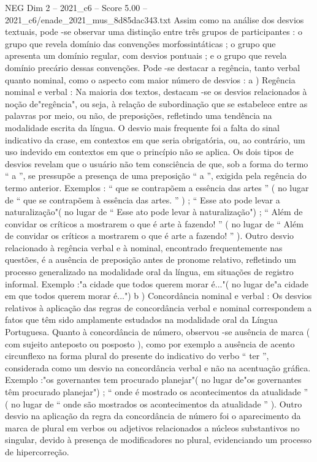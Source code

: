 \begin{textsample}{NEG Dim 2 – 2021\_c6 – Score 5.00 – 2021\_c6/enade\_2021\_mus\_8d85dac343.txt}
Assim como na análise dos desvios textuais, pode -se observar uma distinção entre três grupos de participantes : o grupo que revela domínio das convenções morfossintáticas ; o grupo que apresenta um domínio regular, com desvios pontuais ; e o grupo que revela domínio precário dessas convenções.
Pode -se destacar a regência, tanto verbal quanto nominal, como o aspecto com maior número de desvios : a ) Regência nominal e verbal : Na maioria dos textos, destacam -se os desvios relacionados à noção de"regência", ou seja, à relação de subordinação que se estabelece entre as palavras por meio, ou não, de preposições, refletindo uma tendência na modalidade escrita da língua.
O desvio mais frequente foi a falta do sinal indicativo da crase, em contextos em que seria obrigatória, ou, ao contrário, um uso indevido em contextos em que o princípio não se aplica.
Os dois tipos de desvios revelam que o usuário não tem consciência de que, sob a forma do termo “ a ”, se pressupõe a presença de uma preposição “ a ”, exigida pela regência do termo anterior.
Exemplos : “ que se contrapõem a essência das artes ” ( no lugar de “ que se contrapõem à essência das artes. ” ) ; “ Esse ato pode levar a naturalização"( no lugar de “ Esse ato pode levar à naturalização") ; “ Além de convidar os críticos a mostrarem o que é arte à fazendo! ” ( no lugar de “ Além de convidar os críticos a mostrarem o que é arte a fazendo! ” ).
Outro desvio relacionado à regência verbal e à nominal, encontrado frequentemente nas questões, é a ausência de preposição antes de pronome relativo, refletindo um processo generalizado na modalidade oral da língua, em situações de registro informal.
Exemplo :"a cidade que todos querem morar é..."( no lugar de"a cidade em que todos querem morar é...") b ) Concordância nominal e verbal : Os desvios relativos à aplicação das regras de concordância verbal e nominal correspondem a fatos que têm sido amplamente estudados na modalidade oral da Língua Portuguesa.
Quanto à concordância de número, observou -se ausência de marca ( com sujeito anteposto ou posposto ), como por exemplo a ausência de acento circunflexo na forma plural do presente do indicativo do verbo “ ter ”, considerada como um desvio na concordância verbal e não na acentuação gráfica.
Exemplo :"os governantes tem procurado planejar"( no lugar de"os governantes têm procurado planejar") ; “ onde é mostrado os acontecimentos da atualidade ” ( no lugar de “ onde são mostrados os acontecimentos da atualidade ” ).
Outro desvio na aplicação da regra da concordância de número foi o aparecimento da marca de plural em verbos ou adjetivos relacionados a núcleos substantivos no singular, devido à presença de modificadores no plural, evidenciando um processo de hipercorreção.

\end{textsample}
